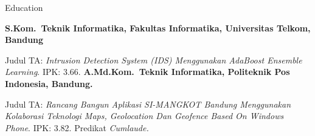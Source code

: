 \begin{rubric}{Education}

\entry*[2016 -- 2018]%
	\textbf{S.Kom.~Teknik Informatika, Fakultas Informatika, Universitas Telkom, Bandung} \par
	Judul TA: \emph{Intrusion Detection System (IDS) Menggunakan AdaBoost Ensemble Learning}. IPK: 3.66.
%
\entry*[2012 -- 2015]%
	\textbf{A.Md.Kom.~Teknik Informatika, Politeknik Pos Indonesia, Bandung.}\par
      Judul TA: \emph{Rancang Bangun Aplikasi SI-MANGKOT Bandung Menggunakan Kolaborasi Teknologi Maps, Geolocation Dan Geofence Based On Windows Phone}. IPK: 3.82. Predikat \emph{Cumlaude.}
%
\end{rubric}